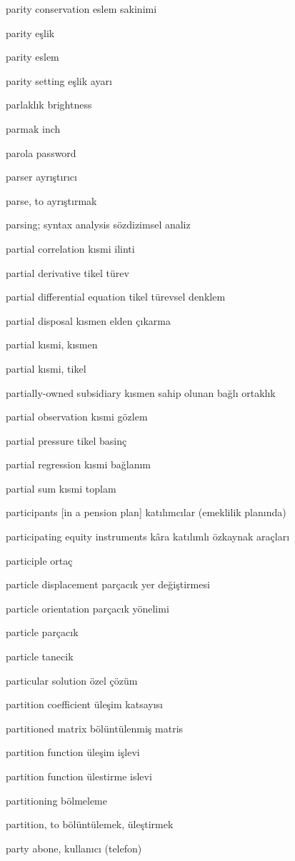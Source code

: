 \documentclass[12pt,fleqn]{article}\usepackage{../../common}
\begin{document}
parity conservation eslem sakinimi

parity eşlik

parity eslem

parity setting eşlik ayarı

parlaklık brightness

parmak inch

parola password

parser ayrıştırıcı

parse, to ayrıştırmak

parsing; syntax analysis sözdizimsel analiz

partial correlation kısmi ilinti

partial derivative tikel türev

partial differential equation tikel türevsel denklem

partial disposal kısmen elden çıkarma

partial kısmi, kısmen

partial kısmi, tikel

partially-owned subsidiary kısmen sahip olunan bağlı ortaklık

partial observation kısmi gözlem

partial pressure tikel basinç

partial regression kısmi bağlanım

partial sum kısmi toplam

participants [in a pension plan] katılımcılar (emeklilik planında)

participating equity instruments kâra katılımlı özkaynak araçları

participle ortaç

particle displacement parçacık yer değiştirmesi

particle orientation parçacık yönelimi

particle parçacık

particle tanecik

particular solution özel çözüm

partition coefficient üleşim katsayısı

partitioned matrix bölüntülenmiş matris

partition function üleşim işlevi

partition function ülestirme islevi

partitioning bölmeleme

partition, to bölüntülemek, üleştirmek

party abone, kullanıcı (telefon)
\end{document}
